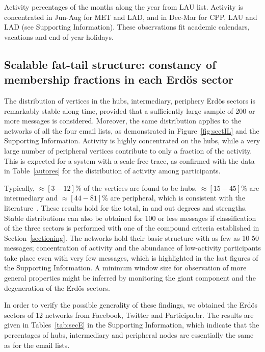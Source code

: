\documentclass[%
	aip,
	jmp,%
	amsmath,amssymb,
	reprint,%
]{revtex4-1}
\begin{document}
\begin{table}
	\caption{Activity percentages of the months along the year from LAU list. Activity is concentrated in Jun-Aug for MET and LAD, and in Dec-Mar for CPP, LAU and LAD (see Supporting Information). These observations fit academic calendars, vacations and end-of-year holidays.}
	\footnotesize
	
	\label{tab:min2}
\end{table}

\subsection{Scalable fat-tail structure: constancy of membership fractions in each Erd\"os sector}\label{subsec:pih}

The distribution of vertices in the hubs, intermediary, periphery Erd\"os sectors is remarkably stable along time, provided that a sufficiently large sample of 200 or more messages is considered. 
Moreover, the same distribution applies to the networks of all the four email lists, as demonstrated in Figure~\ref{fig:sectIL} and the Supporting Information. 
Activity is highly concentrated on the hubs, while a very large number of peripheral vertices contribute to only a fraction of the activity. This is expected for a system with a scale-free trace, as confirmed with the data in Table~\ref{autores} for the distribution of activity among participants.

Typically, $\approx [3-12]\%$ of the vertices are found to be hubs, $\approx [15-45]\%$ are intermediary and $\approx [44-81]\%$ are peripheral, which is consistent with the literature~\cite{secFree}.
These results hold for the total, in and out degrees and strengths.
Stable distributions can also be obtained for 100 or less messages if classification of the three sectors is performed with one of the compound criteria established in Section~\ref{sectioning}. 
The networks hold their basic structure with as few as 10-50 messages; concentration of activity and the abundance of low-activity participants take place even with very few messages, which is highlighted in the last figures of the Supporting Information.
A minimum window size for observation of more general properties might be inferred by monitoring the giant component and the degeneration of the Erd\"os sectors.

In order to verify the possible generality of these findings, we obtained the Erd\"os sectors of 12 networks from Facebook, Twitter and Participa.br. The results are given in Tables~\ref{tab:secE} in the Supporting Information, which indicate that the percentages of hubs, intermediary and peripheral nodes are essentially the same as for the email lists.
\end{document}
